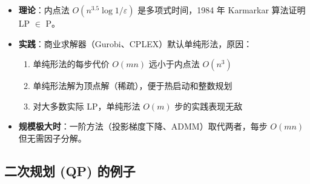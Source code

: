 \documentclass[12pt, a4paper]{ctexart}
\begin{document}
\begin{insight}

\begin{itemize}
    \item \textbf{理论}：内点法 $O(n^{3.5} \log 1/\varepsilon)$ 是多项式时间，1984 年 Karmarkar 算法证明 LP $\in$ P。
    \item \textbf{实践}：商业求解器（Gurobi、CPLEX）默认单纯形法，原因：
    \begin{enumerate}
        \item 单纯形法的每步代价 $O(mn)$ 远小于内点法 $O(n^3)$
        \item 单纯形法解为顶点解（稀疏），便于热启动和整数规划
        \item 对大多数实际 LP，单纯形法 $O(m)$ 步的实践表现无敌
    \end{enumerate}
    \item \textbf{规模极大时}：一阶方法（投影梯度下降、ADMM）取代两者，每步 $O(mn)$ 但无需因子分解。
\end{itemize}

\end{insight}

\subsection{二次规划 (QP) 的例子}
\end{document}
